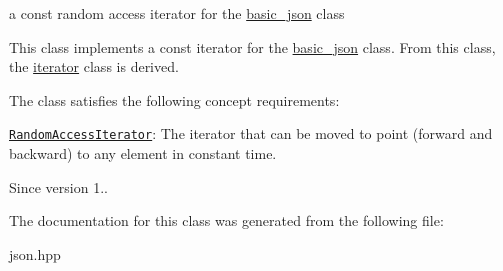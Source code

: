 a const random access iterator for the \hyperlink{a00025}{basic\+\_\+json} class 

This class implements a const iterator for the \hyperlink{a00025}{basic\+\_\+json} class. From this class, the \hyperlink{a00079}{iterator} class is derived.

The class satisfies the following concept requirements\+:
\begin{DoxyItemize}
\item \href{http://en.cppreference.com/w/cpp/concept/RandomAccessIterator}{\tt Random\+Access\+Iterator}\+: The iterator that can be moved to point (forward and backward) to any element in constant time.
\end{DoxyItemize}

\begin{DoxySince}{Since}
version 1.. 
\end{DoxySince}


The documentation for this class was generated from the following file\+:\begin{DoxyCompactItemize}
\item 
json.\+hpp\end{DoxyCompactItemize}
